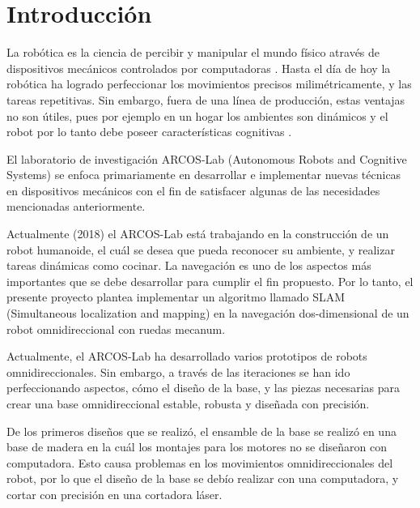   \chapter{Introducción}
\label{C:introduccion}




La robótica es la ciencia de percibir y manipular el mundo físico através de dispositivos mecánicos controlados por computadoras \cite{Thrun2005}. Hasta el día de hoy la robótica ha logrado perfeccionar los movimientos precisos milimétricamente, y las tareas repetitivas. Sin embargo, fuera de una línea de producción, estas ventajas no son útiles, pues por ejemplo en un hogar los ambientes son dinámicos y el robot por lo tanto debe poseer características cognitivas \cite{HelioAzevedoRenatoArcherITCenterandICM/USPJosePedroR.InstituteofMathematicalandComputerSciences2017}.

El laboratorio de investigación ARCOS-Lab (Autonomous Robots and Cognitive Systems) se enfoca primariamente en desarrollar e implementar nuevas técnicas en dispositivos mecánicos con el fin de satisfacer algunas de las necesidades mencionadas anteriormente.

Actualmente (2018) el ARCOS-Lab está trabajando en la construcción de un robot humanoide, el cuál se desea que pueda reconocer su ambiente, y realizar tareas dinámicas como cocinar. La navegación es uno de los aspectos más importantes que se debe desarrollar para cumplir el fin propuesto. Por lo tanto, el presente proyecto plantea implementar un algoritmo llamado SLAM (Simultaneous localization and mapping) en la navegación dos-dimensional de un robot omnidireccional con ruedas mecanum.

Actualmente, el ARCOS-Lab ha desarrollado varios prototipos de robots omnidireccionales. Sin embargo, a través de las iteraciones se han ido perfeccionando aspectos, cómo el diseño de la base, y las piezas necesarias para crear una base omnidireccional estable, robusta y diseñada con precisión.

De los primeros diseños que se realizó, el ensamble de la base se realizó en una base de madera en la cuál los montajes para los motores no se diseñaron con computadora. Esto causa problemas en los movimientos omnidireccionales del robot, por lo que el diseño de la base se debío realizar con una computadora, y cortar con precisión en una cortadora láser.


